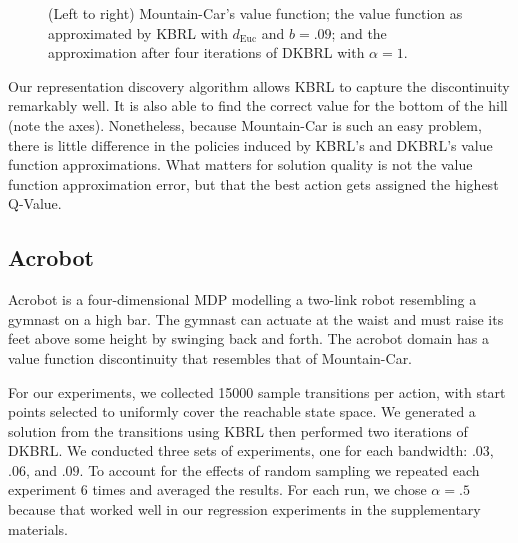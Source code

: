 \documentclass{article} %
\begin{document}
\begin{figure}[!htb]
  \endminipage
\caption{(Left to right) Mountain-Car's value function; the value function
as approximated by KBRL with $d_\mathrm{Euc}$ and $b=.09$; and
the approximation after four iterations of DKBRL with $\alpha=1$.}
\end{figure}

Our representation discovery algorithm allows KBRL to capture the discontinuity
remarkably well. It is also able to find the correct value for the bottom of the hill
(note the axes).
Nonetheless, because Mountain-Car is such an easy problem,
there is little difference in the policies induced by KBRL's and DKBRL's
value function approximations.
What matters for solution quality is not the value function approximation error, but
that the best action gets assigned the highest Q-Value.

\subsection{Acrobot}
Acrobot is a four-dimensional MDP \cite{rlai} modelling a two-link robot resembling a
gymnast on a high bar.
The gymnast can actuate at the waist and must raise its feet above some height by swinging
back and forth.
The acrobot domain has a value function discontinuity that resembles that of Mountain-Car.

For our experiments, we collected 15000 sample transitions per action, with start points
selected to uniformly cover the reachable state space.
We generated a solution from the transitions using KBRL then performed two iterations of DKBRL.
We conducted three sets of experiments, one for each bandwidth: $.03$, $.06$, and $.09$.
To account for the effects of random sampling we repeated each experiment 6 times and averaged
the results. For each run, we chose $\alpha = .5$ because that worked well in our regression experiments
in the supplementary materials.
\end{document}

